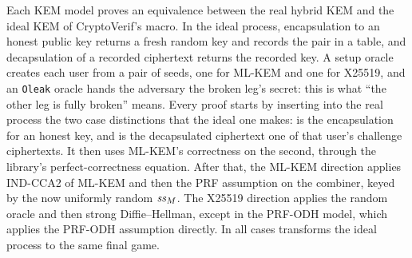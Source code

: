 Each KEM model proves an equivalence between the real hybrid KEM and the
ideal KEM of CryptoVerif's  macro. In the ideal
process, encapsulation to an honest public key returns a fresh random key
and records the pair in a table, and decapsulation of a recorded ciphertext
returns the recorded key. A setup oracle creates each user from a pair of
seeds, one for ML-KEM and one for X25519, and an \texttt{Oleak} oracle hands
the adversary the broken leg's secret: this is what ``the other leg is fully
broken'' means. Every proof starts by inserting into the real process the
two case distinctions that the ideal one makes: is the encapsulation for an
honest key, and is the decapsulated ciphertext one of that user's challenge
ciphertexts. It then uses ML-KEM's correctness on the second, through the
library's perfect-correctness equation. After that, the ML-KEM direction
applies IND-CCA2 of ML-KEM and then the PRF assumption on the combiner, keyed
by the now uniformly random $\mathit{ss}_M$. The X25519 direction applies the random
oracle and then strong Diffie--Hellman, except in the PRF-ODH model, which
applies the PRF-ODH assumption directly. In all cases
 transforms the ideal process to the same
final game.

